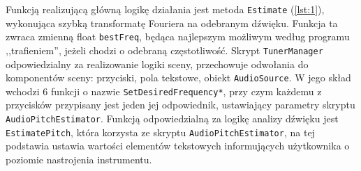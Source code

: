 Funkcją realizującą główną logikę działania jest metoda \texttt{Estimate} (\ref{lst:1}), wykonująca szybką transformatę Fouriera na odebranym dźwięku. Funkcja ta zwraca zmienną float \texttt{bestFreq}, będąca najlepszym możliwym według programu ,,trafieniem'', jeżeli chodzi o odebraną częstotliwość. Skrypt \texttt{TunerManager} odpowiedzialny za realizowanie logiki sceny, przechowuje odwołania do komponentów sceny: przyciski, pola tekstowe, obiekt \texttt{AudioSource}. W jego skład wchodzi 6 funkcji o nazwie \texttt{SetDesiredFrequency*}, przy czym każdemu z przycisków przypisany jest jeden jej odpowiednik, ustawiający parametry skryptu \texttt{AudioPitchEstimator}. Funkcją odpowiedzialną za logikę analizy dźwięku jest \texttt{EstimatePitch}, która korzysta ze skryptu \texttt{AudioPitchEstimator}, na tej podstawia ustawia wartości elementów tekstowych informujących użytkownika o poziomie nastrojenia instrumentu. 

